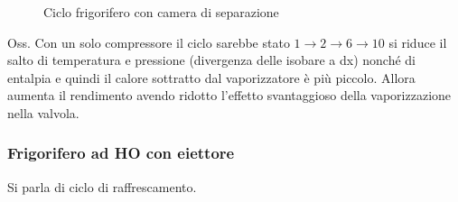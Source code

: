 \documentclass[a4paper]{article}
\numberwithin{equation}{section}%
\begin{document}
\begin{figure}[H]
	\begin{center}
		\centering%
	\end{center}
	\caption{Ciclo frigorifero con camera di separazione }
\end{figure}

Oss. Con un solo compressore il ciclo sarebbe stato $1 \to 2\to6\to 10 $ si riduce il salto di temperatura e pressione (divergenza delle isobare a dx) nonché di entalpia e quindi il calore sottratto dal vaporizzatore è più piccolo. Allora aumenta il rendimento avendo ridotto l'effetto svantaggioso della vaporizzazione nella valvola. 



\subsubsection{Frigorifero ad HO con eiettore }

Si parla di ciclo di raffrescamento. 
\end{document}
